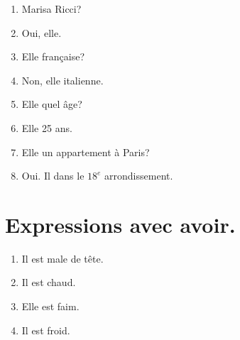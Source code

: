 \begin{enumerate}
    \item {} Marisa Ricci?
    \item Oui,  elle.
    \item Elle  française?
    \item Non, elle  italienne.
    \item Elle  quel âge?
    \item Elle  25 ans.
    \item Elle  un appartement à Paris?
    \item Oui. Il  dans le $18^e$ arrondissement.
\end{enumerate}

\section{Expressions avec avoir.}

\begin{enumerate}
    \item Il est male de tête.
    \item Il est chaud.
    \item Elle est faim.
    \item Il est froid.
\end{enumerate}